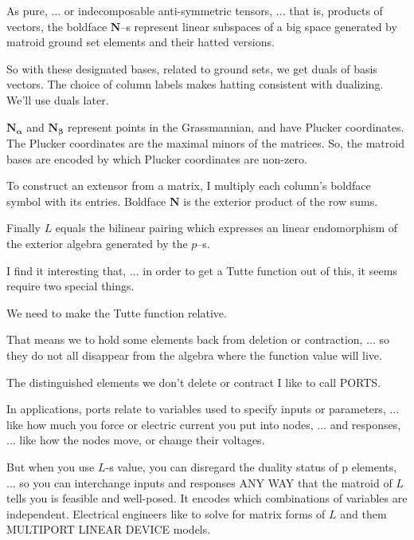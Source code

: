 \documentclass{article}
\begin{document}
  As pure, ... or indecomposable anti-symmetric tensors, ... that is, 
  products of vectors, the boldface
  $\mathbf{N}$--s represent linear subspaces of a big space generated
  by matroid ground set elements and their hatted versions.

  So with these designated bases, related to ground sets,
  we get duals of basis vectors.
  The choice of column labels makes hatting consistent with dualizing.
  We'll use duals later.


  $\mathbf{N_\alpha}$ and $\mathbf{N_\beta}$ represent points in the
  Grassmannian, and have Plucker coordinates.
  The Plucker coordinates are the maximal minors of the matrices.
  So, the matroid bases are encoded by which Plucker coordinates are non-zero.


  To construct an extensor from a matrix,
  I multiply each column's boldface symbol with its entries.
  Boldface $\mathbf{N}$ is the exterior product of the row sums.


  Finally $L$ equals the bilinear pairing which expresses an linear endomorphism
  of the exterior algebra generated by the $p$--s.


  I find it interesting that, ... in order to get a Tutte function out
  of this, it seems require two special things.


 We need to make the Tutte function relative.


  That means we to hold some elements back from deletion or contraction,
  ... so they do not all disappear from the algebra where the function value
  will live.


  The distinguished elements we don't delete or contract I like to call PORTS.

%

 In applications, ports relate to variables used to specify inputs
  or parameters, ... like how much you force or electric current you
  put into nodes, ...
  and responses, ... like how the nodes move, or change their voltages.

 But when you use $L$-s value, you can disregard the duality
  status of p elements, ... so 
  you can interchange inputs and responses ANY WAY that the
  matroid of $L$ tells you is feasible and well-posed.  It encodes which
  combinations of variables are independent.
  Electrical engineers like to solve for matrix forms of $L$ and 
  them MULTIPORT LINEAR DEVICE models.
\end{document}

